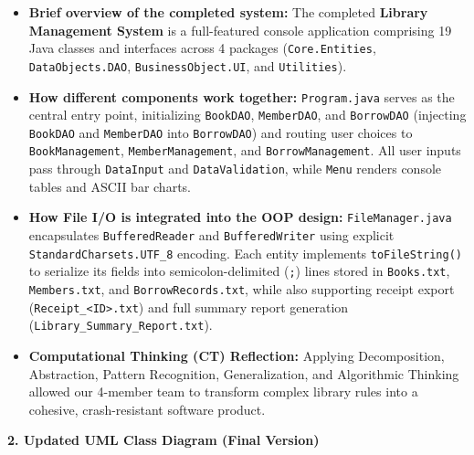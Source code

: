 \documentclass[12pt,a4paper]{article}
\begin{document}
\begin{itemize}[leftmargin=1.2cm]
    \item \textbf{Brief overview of the completed system:} The completed \textbf{Library Management System} is a full-featured console application comprising 19 Java classes and interfaces across 4 packages (\texttt{Core.Entities}, \texttt{DataObjects.DAO}, \texttt{BusinessObject.UI}, and \texttt{Utilities}).
    \item \textbf{How different components work together:} \texttt{Program.java} serves as the central entry point, initializing \texttt{BookDAO}, \texttt{MemberDAO}, and \texttt{BorrowDAO} (injecting \texttt{BookDAO} and \texttt{MemberDAO} into \texttt{BorrowDAO}) and routing user choices to \texttt{BookManagement}, \texttt{MemberManagement}, and \texttt{BorrowManagement}. All user inputs pass through \texttt{DataInput} and \texttt{DataValidation}, while \texttt{Menu} renders console tables and ASCII bar charts.
    \item \textbf{How File I/O is integrated into the OOP design:} \texttt{FileManager.java} encapsulates \texttt{BufferedReader} and \texttt{BufferedWriter} using explicit \texttt{StandardCharsets.UTF\_8} encoding. Each entity implements \texttt{toFileString()} to serialize its fields into semicolon-delimited (\texttt{;}) lines stored in \texttt{Books.txt}, \texttt{Members.txt}, and \texttt{BorrowRecords.txt}, while also supporting receipt export (\texttt{Receipt\_<ID>.txt}) and full summary report generation (\texttt{Library\_Summary\_Report.txt}).
    \item \textbf{Computational Thinking (CT) Reflection:} Applying Decomposition, Abstraction, Pattern Recognition, Generalization, and Algorithmic Thinking allowed our 4-member team to transform complex library rules into a cohesive, crash-resistant software product.
\end{itemize}

\textbf{2. Updated UML Class Diagram (Final Version)}
\end{document}
